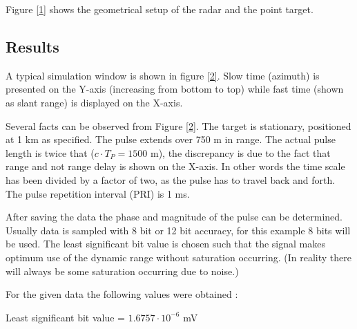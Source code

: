 \documentclass[thmsa,a4paper,ukenglish]{report}
\begin{document}
\smallskip \smallskip Figure \ref{1} shows the geometrical setup of the
radar and the point target.\smallskip


\subsection{\protect\smallskip \protect\smallskip Results}

A typical simulation window is shown in figure \ref{2}. Slow time (azimuth)
is presented on the Y-axis (increasing from bottom to top) while fast time
(shown as slant range) is displayed on the X-axis.


Several facts can be observed from Figure \ref{2}. The target is stationary,
positioned at 1 km as specified. The pulse extends over 750 m in range. The
actual pulse length is twice that ($c\cdot T_{P}=1500$ m), the discrepancy
is due to the fact that range and not range delay is shown on the X-axis. In
other words the time scale has been divided by a factor of two, as the pulse
has to travel back and forth. The pulse repetition interval (PRI) is 1 ms.

After saving the data the phase and magnitude of the pulse can be
determined. Usually data is sampled with 8 bit or 12 bit accuracy, for this
example 8 bits will be used. The least significant bit value is chosen such
that the signal makes optimum use of the dynamic range without saturation
occurring. (In reality there will always be some saturation occurring due to
noise.)

For the given data the following values were obtained :

Least significant bit value = $1.6757\cdot 10^{-6}$ mV
\end{document}
